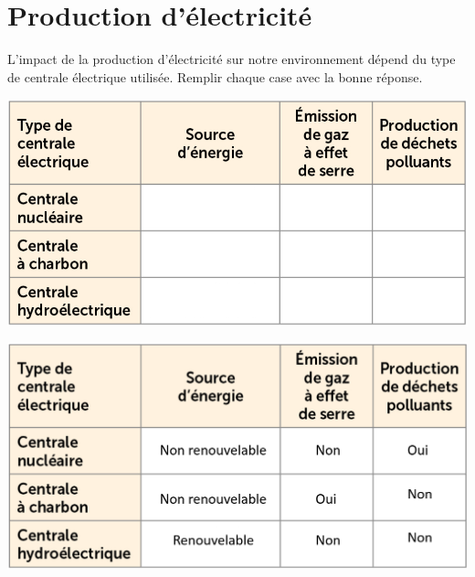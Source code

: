 \section{Production d'électricité}\label{ex:prod}

L'impact de la production d'électricité sur notre environnement dépend du type de centrale électrique utilisée.
Remplir chaque case avec la bonne réponse.

\begin{center}
	\includegraphics[scale=0.5]{img/tab_centrales}
\end{center}

\begin{solution}
	\includegraphics[scale=0.5]{img/tab_centrales2}
\end{solution}
